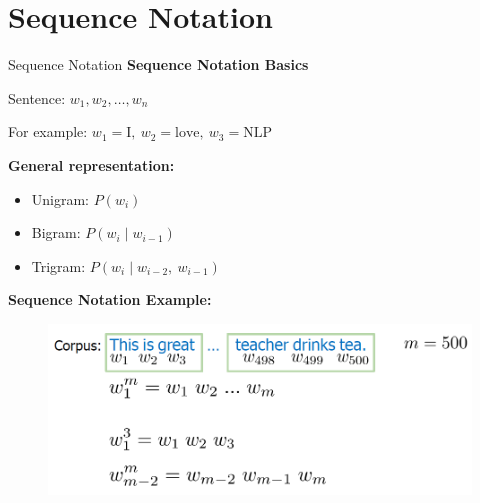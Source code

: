 \section{Sequence Notation}

\begin{frame}[allowframebreaks]{Sequence Notation}
    \textbf{Sequence Notation Basics}

    Sentence: $w_1, w_2, \ldots, w_n$

    For example: $w_1 = \text{I},\ w_2 = \text{love},\ w_3 = \text{NLP}$

    \vspace{1em}
    \textbf{General representation:}
    \begin{itemize}
        \item Unigram: $P(w_i)$
        \item Bigram: $P(w_i \mid w_{i-1})$
        \item Trigram: $P(w_i \mid w_{i-2},\ w_{i-1})$
    \end{itemize}
\framebreak
    \textbf{Sequence Notation Example:}
    \begin{figure}
        \centering
        \includegraphics[width=\textwidth,height=0.8\textheight,keepaspectratio]{images/nlp-intro/sequence-notation.png}
    \end{figure}
\end{frame}